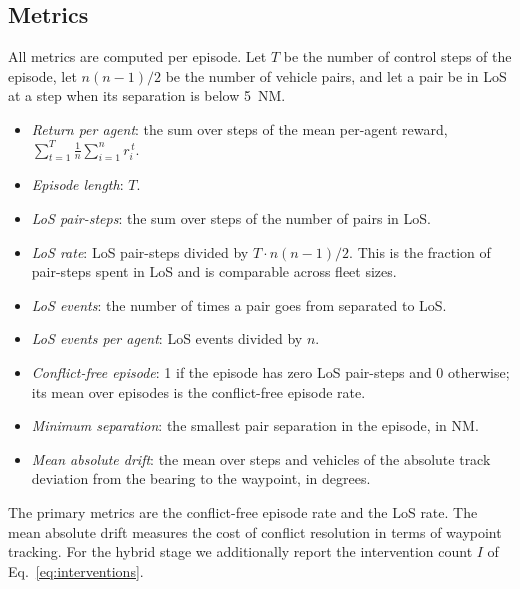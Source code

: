 \subsection{Metrics}
\label{subsec:metrics}
All metrics are computed per episode. Let $T$ be the number of control steps of the
episode, let $n(n-1)/2$ be the number of vehicle pairs, and let a pair be in LoS at a step
when its separation is below 5~NM.
\begin{itemize}
\item \emph{Return per agent}: the sum over steps of the mean per-agent reward,
      $\sum_{t=1}^{T}\frac{1}{n}\sum_{i=1}^{n} r_i^{\,t}$.
\item \emph{Episode length}: $T$.
\item \emph{LoS pair-steps}: the sum over steps of the number of pairs in LoS.
\item \emph{LoS rate}: LoS pair-steps divided by $T\cdot n(n-1)/2$. This is the fraction of
      pair-steps spent in LoS and is comparable across fleet sizes.
\item \emph{LoS events}: the number of times a pair goes from separated to LoS.
\item \emph{LoS events per agent}: LoS events divided by $n$.
\item \emph{Conflict-free episode}: 1 if the episode has zero LoS pair-steps and 0
      otherwise; its mean over episodes is the conflict-free episode rate.
\item \emph{Minimum separation}: the smallest pair separation in the episode, in NM.
\item \emph{Mean absolute drift}: the mean over steps and vehicles of the absolute track
      deviation from the bearing to the waypoint, in degrees.
\end{itemize}
The primary metrics are the conflict-free episode rate and the LoS rate. The mean absolute
drift measures the cost of conflict resolution in terms of waypoint tracking. For the
hybrid stage we additionally report the intervention count $I$ of
Eq.~\eqref{eq:interventions}.

